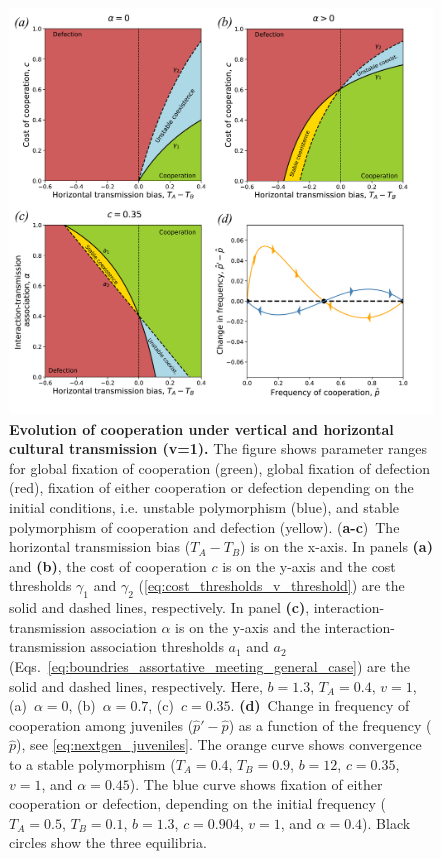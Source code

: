 \documentclass[12pt]{extarticle}
\begin{document}

\begin{figure}[p]
  \centering       
	\includegraphics[width=1\textwidth]{../PRSB_figures/fig_4.pdf}
    \caption{\textbf{Evolution of cooperation under vertical and horizontal cultural transmission (v=1).} 
    The figure shows parameter ranges for global fixation of cooperation (green), global fixation of defection (red), fixation of either cooperation or defection depending on the initial conditions, i.e. unstable polymorphism (blue), and stable polymorphism of cooperation and defection (yellow).
    (\textbf{a-c})~The horizontal transmission bias ($T_A-T_B$) is on the x-axis.
    In panels \textbf{(a)} and \textbf{(b)}, the cost of cooperation $c$ is on the y-axis and the cost thresholds $\gamma_1$ and $\gamma_2$ (\autoref{eq:cost_thresholds_v_threshold}) are the solid and dashed lines, respectively. 
	In panel \textbf{(c)}, interaction-transmission association $\alpha$ is on the y-axis and the interaction-transmission association thresholds $a_1$ and $a_2$ (Eqs.~\ref{eq:boundries_assortative_meeting_general_case}) are the solid and dashed lines, respectively.
    Here, $b=1.3$, $T_A=0.4$, $v=1$, (a)~$\alpha = 0$, (b)~$\alpha = 0.7$, (c)~$c = 0.35$.    
    \textbf{(d)}~Change in frequency of cooperation among juveniles ($\hat{p}'-\hat{p}$) as a function of the frequency ($\hat{p}$), see \autoref{eq:nextgen_juveniles}.
    The orange curve shows convergence to a stable polymorphism ($T_A = 0.4$, $T_B = 0.9$, $b = 12$, $c=0.35$, $v=1$, and $\alpha = 0.45$). %
    The blue curve shows fixation of either cooperation or defection, depending on the initial frequency ($T_A = 0.5$, $T_B = 0.1$, $b = 1.3$, $c=0.904$, $v=1$, and $\alpha = 0.4$).
    Black circles show the three equilibria.
  	}
    \label{fig:equilibria_v1}
\end{figure}
\newpage
\end{document}
